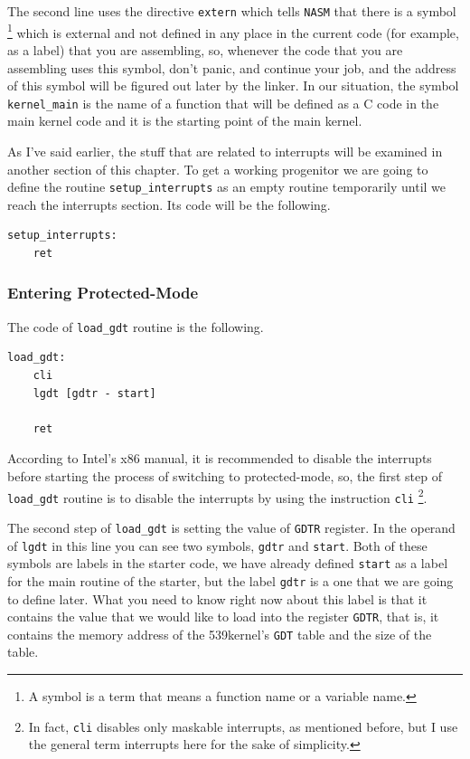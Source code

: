 The second line uses the directive \lstinline!extern! which tells
\lstinline!NASM! that there is a symbol \footnote{A symbol is a term
  that means a function name or a variable name.} which is external and
not defined in any place in the current code (for example, as a label)
that you are assembling, so, whenever the code that you are assembling
uses this symbol, don't panic, and continue your job, and the address of
this symbol will be figured out later by the linker. In our situation,
the symbol \lstinline!kernel_main! is the name of a function that will
be defined as a C code in the main kernel code and it is the starting
point of the main kernel.

As I've said earlier, the stuff that are related to interrupts will be
examined in another section of this chapter. To get a working progenitor
we are going to define the routine \lstinline!setup_interrupts! as an
empty routine temporarily until we reach the interrupts section. Its
code will be the following.

\begin{lstlisting}
setup_interrupts:
    ret
\end{lstlisting}

\subsubsection{Entering Protected-Mode}\label{entering-protected-mode}

The code of \lstinline!load_gdt! routine is the following.

\begin{lstlisting}
load_gdt:
    cli
    lgdt [gdtr - start]
    
    ret
\end{lstlisting}

According to Intel's x86 manual, it is recommended to disable the
interrupts before starting the process of switching to protected-mode,
so, the first step of \lstinline!load_gdt! routine is to disable the
interrupts by using the instruction \lstinline!cli! \footnote{In fact,
  \lstinline!cli! disables only maskable interrupts, as mentioned
  before, but I use the general term interrupts here for the sake of
  simplicity.}.

The second step of \lstinline!load_gdt! is setting the value of
\lstinline!GDTR! register. In the operand of \lstinline!lgdt! in this
line you can see two symbols, \lstinline!gdtr! and \lstinline!start!.
Both of these symbols are labels in the starter code, we have already
defined \lstinline!start! as a label for the main routine of the
starter, but the label \lstinline!gdtr! is a one that we are going to
define later. What you need to know right now about this label is that
it contains the value that we would like to load into the register
\lstinline!GDTR!, that is, it contains the memory address of the
539kernel's \lstinline!GDT! table and the size of the table.

